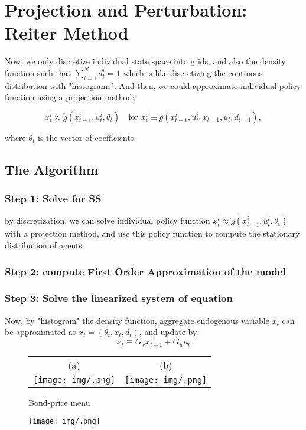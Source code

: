\section{Projection and Perturbation: Reiter Method}

Now, we only {\color{red}discretize individual state space into grids}, and also the density function such that $\sum_{i=1}^{N} d^i_t = 1$ which is like discretizing the continous distribution with "histograms". And then, we could approximate individual policy function using a projection method:

\[ 
x^i_t \approx \tilde{g}(x^i_{t-1},u^i_t, \theta_t) \quad \text{for } x^i_t \equiv g(x^i_{t-1}, u^i_t, x_{t-1},u_t,d_{t-1}), 
\]

where $\theta_t$ is the vector of coefficients. 

\subsection{The Algorithm}

\subsubsection*{Step 1: Solve for SS}

by discretization, we can solve individual policy function $x^i_t \approx \tilde{g}(x^i_{t-1},u^i_t, \theta_t)$ with a projection method, and use this policy function to compute the stationary distribution of agents

\subsubsection*{Step 2: compute First Order Approximation of the model}

\subsubsection*{Step 3: Solve the linearized system of equation }
Now, by "histogram" the density function, aggregate endogenous variable $x_t$ can be approximated  as $\tilde{x_t} = (\theta_t, x_t, d_t)$, and update by:
\[ \tilde{x_t} \equiv G_x \tilde{x_{t-1}} + G_u u_t\]





\begin{figure}[H]
\caption{Bond-price menu}
\hspace{-2.0cm}
\begin{center}
\begin{tabular}{cc}
\multicolumn{1}{c}{(a) } &  
\multicolumn{1}{c}{(b) }\\
\texttt{[image: img/.png]}   & 
\texttt{[image: img/.png]} 
\end{tabular}
\end{center}
\label{fig:4}
\end{figure}



\begin{figure}[H]
\caption{}
\hspace{-2.0cm}
\begin{center}
\texttt{[image: img/.png]}
\end{center}
\end{figure}

 